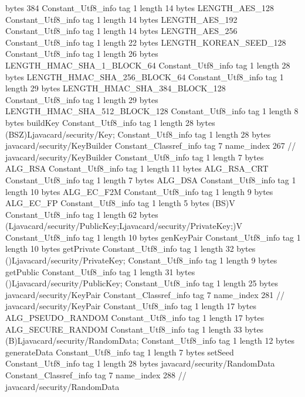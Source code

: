 {{{			bytes	384
		}
		Constant_Utf8_info {
			tag	1
			length	14
			bytes	LENGTH_AES_128
		}
		Constant_Utf8_info {
			tag	1
			length	14
			bytes	LENGTH_AES_192
		}
		Constant_Utf8_info {
			tag	1
			length	14
			bytes	LENGTH_AES_256
		}
		Constant_Utf8_info {
			tag	1
			length	22
			bytes	LENGTH_KOREAN_SEED_128
		}
		Constant_Utf8_info {
			tag	1
			length	26
			bytes	LENGTH_HMAC_SHA_1_BLOCK_64
		}
		Constant_Utf8_info {
			tag	1
			length	28
			bytes	LENGTH_HMAC_SHA_256_BLOCK_64
		}
		Constant_Utf8_info {
			tag	1
			length	29
			bytes	LENGTH_HMAC_SHA_384_BLOCK_128
		}
		Constant_Utf8_info {
			tag	1
			length	29
			bytes	LENGTH_HMAC_SHA_512_BLOCK_128
		}
		Constant_Utf8_info {
			tag	1
			length	8
			bytes	buildKey
		}
		Constant_Utf8_info {
			tag	1
			length	28
			bytes	(BSZ)Ljavacard/security/Key;
		}
		Constant_Utf8_info {
			tag	1
			length	28
			bytes	javacard/security/KeyBuilder
		}
		Constant_Classref_info {
			tag	7
			name_index	267		// javacard/security/KeyBuilder
		}
		Constant_Utf8_info {
			tag	1
			length	7
			bytes	ALG_RSA
		}
		Constant_Utf8_info {
			tag	1
			length	11
			bytes	ALG_RSA_CRT
		}
		Constant_Utf8_info {
			tag	1
			length	7
			bytes	ALG_DSA
		}
		Constant_Utf8_info {
			tag	1
			length	10
			bytes	ALG_EC_F2M
		}
		Constant_Utf8_info {
			tag	1
			length	9
			bytes	ALG_EC_FP
		}
		Constant_Utf8_info {
			tag	1
			length	5
			bytes	(BS)V
		}
		Constant_Utf8_info {
			tag	1
			length	62
			bytes	(Ljavacard/security/PublicKey;Ljavacard/security/PrivateKey;)V
		}
		Constant_Utf8_info {
			tag	1
			length	10
			bytes	genKeyPair
		}
		Constant_Utf8_info {
			tag	1
			length	10
			bytes	getPrivate
		}
		Constant_Utf8_info {
			tag	1
			length	32
			bytes	()Ljavacard/security/PrivateKey;
		}
		Constant_Utf8_info {
			tag	1
			length	9
			bytes	getPublic
		}
		Constant_Utf8_info {
			tag	1
			length	31
			bytes	()Ljavacard/security/PublicKey;
		}
		Constant_Utf8_info {
			tag	1
			length	25
			bytes	javacard/security/KeyPair
		}
		Constant_Classref_info {
			tag	7
			name_index	281		// javacard/security/KeyPair
		}
		Constant_Utf8_info {
			tag	1
			length	17
			bytes	ALG_PSEUDO_RANDOM
		}
		Constant_Utf8_info {
			tag	1
			length	17
			bytes	ALG_SECURE_RANDOM
		}
		Constant_Utf8_info {
			tag	1
			length	33
			bytes	(B)Ljavacard/security/RandomData;
		}
		Constant_Utf8_info {
			tag	1
			length	12
			bytes	generateData
		}
		Constant_Utf8_info {
			tag	1
			length	7
			bytes	setSeed
		}
		Constant_Utf8_info {
			tag	1
			length	28
			bytes	javacard/security/RandomData
		}
		Constant_Classref_info {
			tag	7
			name_index	288		// javacard/security/RandomData
}}}
